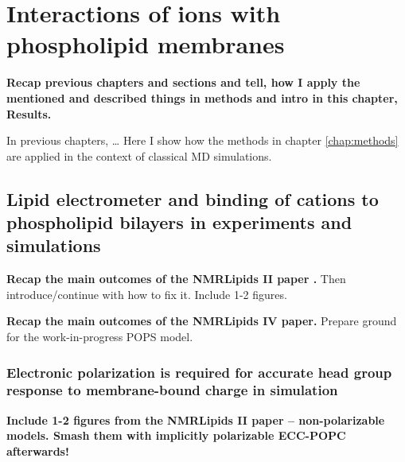 \chapter{Interactions of ions with phospholipid membranes}
\label{chap:results}

\textbf{ Recap previous chapters and sections and tell, how I apply the mentioned and described things in methods and intro in this chapter, Results. }

In previous chapters, \ldots
Here I show how the methods in chapter \ref{chap:methods} are applied in the context of classical MD simulations. 

\section{Lipid electrometer and binding of cations to phospholipid bilayers in experiments and simulations}

\textbf{ Recap the main outcomes of the NMRLipids II paper \citep{catte16}. }
Then introduce/continue with how to fix it. 
Include 1-2 figures. 

\textbf{ Recap the main outcomes of the NMRLipids IV paper. }
Prepare ground for the work-in-progress POPS model. 



\subsection{Electronic polarization is required for accurate head group response to membrane-bound charge in simulation }
\label{section:boundCHARGE} 


\textbf{ Include 1-2 figures from the NMRLipids II paper \citep{catte16} -- non-polarizable models.
         Smash them with implicitly polarizable ECC-POPC afterwards! }
 

